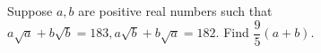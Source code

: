 Suppose $a, b$ are positive real numbers such that $a\sqrt{a} + b\sqrt{b} = 183, a\sqrt{b} + b\sqrt{a} = 182$. Find $\dfrac{9}{5} (a + b)$.
